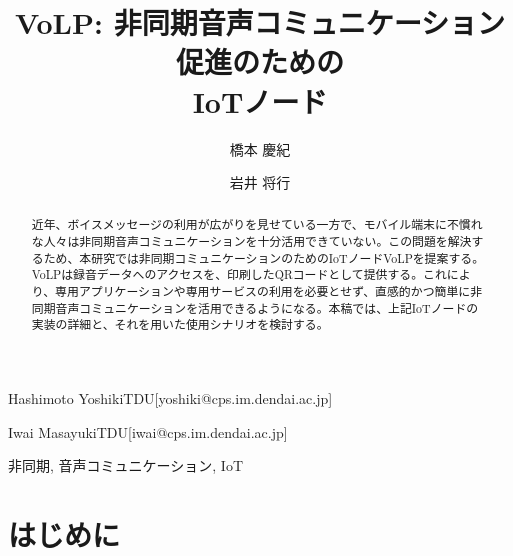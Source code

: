 \documentclass[submit,techrep,noauthor]{ipsj}
\begin{document}
\title{VoLP: 非同期音声コミュニケーション促進のための\\IoTノード}

\author{橋本 慶紀}{Hashimoto Yoshiki}{TDU}[yoshiki@cps.im.dendai.ac.jp]
\author{岩井 将行}{Iwai Masayuki}{TDU}[iwai@cps.im.dendai.ac.jp]

\begin{abstract}
近年、ボイスメッセージの利用が広がりを見せている一方で、モバイル端末に不慣れな人々は非同期音声コミュニケーションを十分活用できていない。この問題を解決するため、本研究では非同期コミュニケーションのためのIoTノードVoLPを提案する。VoLPは録音データへのアクセスを、印刷したQRコードとして提供する。これにより、専用アプリケーションや専用サービスの利用を必要とせず、直感的かつ簡単に非同期音声コミュニケーションを活用できるようになる。本稿では、上記IoTノードの実装の詳細と、それを用いた使用シナリオを検討する。
\end{abstract}

\begin{jkeyword}
非同期, 音声コミュニケーション, IoT
\end{jkeyword}

\maketitle

\section{はじめに}

\end{document}
